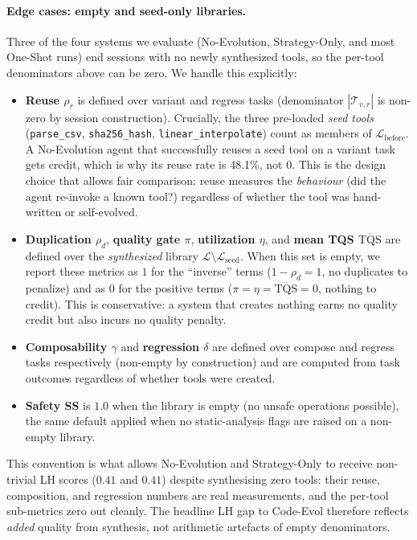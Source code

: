 \documentclass[sigplan,nonacm,natbib=false]{acmart}
\begin{document}
\paragraph{Edge cases: empty and seed-only libraries.}
Three of the four systems we evaluate (No-Evolution, Strategy-Only, and most One-Shot runs) end sessions with no newly synthesized tools, so the per-tool denominators above can be zero. We handle this explicitly:
\begin{itemize}
\item \textbf{Reuse $\rho_r$} is defined over variant and regress tasks (denominator $|\mathcal{T}_{v,r}|$ is non-zero by session construction). Crucially, the three pre-loaded \emph{seed tools} (\texttt{parse\_csv}, \texttt{sha256\_hash}, \texttt{linear\_interpolate}) count as members of $\mathcal{L}_{\text{before}}$. A No-Evolution agent that successfully reuses a seed tool on a variant task gets credit, which is why its reuse rate is 48.1\%, not 0. This is the design choice that allows fair comparison: reuse measures the \emph{behaviour} (did the agent re-invoke a known tool?) regardless of whether the tool was hand-written or self-evolved.
\item \textbf{Duplication $\rho_d$}, \textbf{quality gate $\pi$}, \textbf{utilization $\eta$}, and \textbf{mean TQS $\overline{\text{TQS}}$} are defined over the \emph{synthesized} library $\mathcal{L} \setminus \mathcal{L}_{\text{seed}}$. When this set is empty, we report these metrics as $1$ for the ``inverse'' terms ($1-\rho_d=1$, no duplicates to penalize) and as $0$ for the positive terms ($\pi=\eta=\overline{\text{TQS}}=0$, nothing to credit). This is conservative: a system that creates nothing earns no quality credit but also incurs no quality penalty.
\item \textbf{Composability $\gamma$} and \textbf{regression $\delta$} are defined over compose and regress tasks respectively (non-empty by construction) and are computed from task outcomes regardless of whether tools were created.
\item \textbf{Safety SS} is $1.0$ when the library is empty (no unsafe operations possible), the same default applied when no static-analysis flags are raised on a non-empty library.
\end{itemize}
This convention is what allows No-Evolution and Strategy-Only to receive non-trivial LH scores ($0.41$ and $0.41$) despite synthesising zero tools: their reuse, composition, and regression numbers are real measurements, and the per-tool sub-metrics zero out cleanly. The headline LH gap to Code-Evol therefore reflects \emph{added} quality from synthesis, not arithmetic artefacts of empty denominators.
\end{document}
